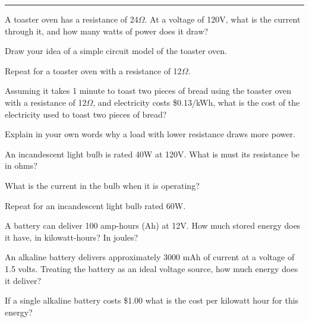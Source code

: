 \documentclass{article}
\begin{document}
\hrule
\vspace{10pt}






\subproblem
A toaster oven has a resistance of 24$\Omega$.  At a voltage of 120V,
what is the current through it, and how many watts of power does it
draw?

\subproblem
Draw your idea of a simple circuit model of the toaster oven.

\subproblem
Repeat for a toaster oven with a resistance of 12$\Omega$.

\subproblem
Assuming it takes 1 minute to toast two pieces of bread using the
toaster oven with a resistance of 12$\Omega$, and electricity costs
\$0.13/kWh, what is the cost of the electricity used to toast two
pieces of bread?

\subproblem
Explain in your own words why a load with lower resistance draws
more power.




\subproblem
An incandescent light bulb is rated 40W at 120V.  What is must its
resistance be in ohms?

\subproblem
What is the current in the bulb when it is operating?

\subproblem
Repeat for an incandescent light bulb rated 60W.



\subproblem
A battery can deliver 100 amp-hours (Ah) at 12V.  How much stored
energy does it have, in kilowatt-hours?  In joules?

\subproblem
An alkaline battery delivers approximately 3000 mAh of current at a
voltage of 1.5 volts.  Treating the battery as an ideal voltage source,
how much energy does it deliver?


\subproblem
If a single alkaline battery costs \$1.00 what is the cost per kilowatt
hour for this energy?

\end{document}
